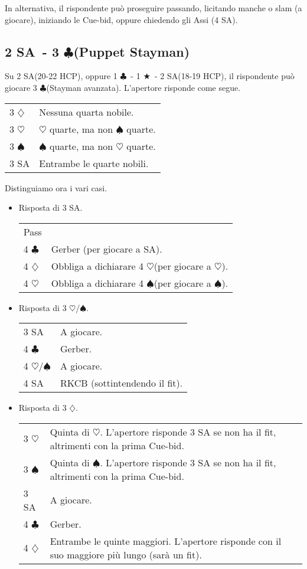 \documentclass[a4paper,10pt]{article}
\renewcommand{\c}{$\clubsuit$\xspace}
\renewcommand{\d}{$\diamondsuit$\xspace}
\newcommand{\h}{$\heartsuit$\xspace}
\newcommand{\s}{$\spadesuit$\xspace}
\renewcommand{\j}{$\bigstar$\xspace}
\newcommand{\sa}{SA\xspace}
\newcommand{\smallspace}{\vskip0.3cm}
\newenvironment{twocol}
  {\smallspace\noindent\begin{tabular}{l p{0.78\textwidth}}}
  {\end{tabular}\smallspace}
\begin{document}
In alternativa, il rispondente può proseguire passando, licitando manche o slam (a giocare), iniziando le Cue-bid, oppure chiedendo gli Assi (4 \sa).

\subsection{2 \sa\ - 3 \c (Puppet Stayman)} Su 2 \sa (20-22 HCP), oppure 1 \c\ - 1 \j\ - 2 \sa (18-19 HCP), il rispondente può giocare 3 \c (Stayman avanzata). L'apertore risponde come segue.
\begin{twocol}
	3 \d & Nessuna quarta nobile.\\
	3 \h & \h quarte, ma non \s quarte.\\
	3 \s & \s quarte, ma non \h quarte.\\
	3 \sa & Entrambe le quarte nobili.\\
\end{twocol}

\noindent Distinguiamo ora i vari casi.
\begin{itemize}
  \item Risposta di 3 \sa.
  \begin{twocol}
    Pass & \\
    4 \c & Gerber (per giocare a \sa).\\
    4 \d & Obbliga a dichiarare 4 \h (per giocare a \h).\\
    4 \h & Obbliga a dichiarare 4 \s (per giocare a \s).\\
  \end{twocol}
  
  \item Risposta di 3 \h/\s.
  \begin{twocol}
    3 \sa & A giocare.\\
    4 \c & Gerber.\\
    4 \h/\s & A giocare.\\
    4 \sa & RKCB (sottintendendo il fit).
  \end{twocol}
  
  \item Risposta di 3 \d.
  \begin{twocol}
    3 \h & Quinta di \h. L'apertore risponde 3 \sa se non ha il fit, altrimenti con la prima Cue-bid.\\
    3 \s & Quinta di \s. L'apertore risponde 3 \sa se non ha il fit, altrimenti con la prima Cue-bid.\\
    3 \sa & A giocare.\\
    4 \c & Gerber.\\
    4 \d & Entrambe le quinte maggiori. L'apertore risponde con il suo maggiore più lungo (sarà un fit).\\
  \end{twocol}
\end{itemize}
\end{document}
